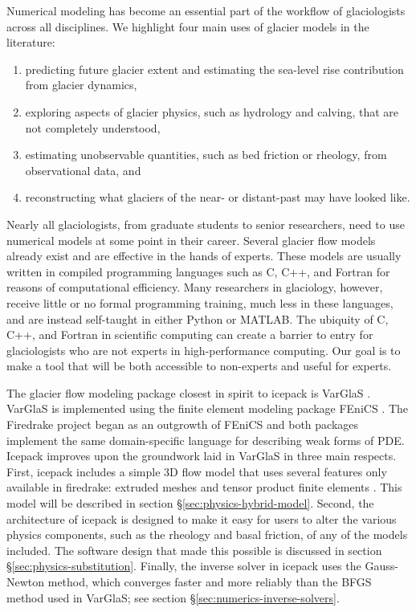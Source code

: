 \documentclass{article}
\theoremstyle{definition}
\theoremstyle{plain}
\begin{document}
Numerical modeling has become an essential part of the workflow of glaciologists across all disciplines.
We highlight four main uses of glacier models in the literature:
\begin{enumerate}
    \item predicting future glacier extent and estimating the sea-level rise contribution from glacier dynamics,
    \item exploring aspects of glacier physics, such as hydrology and calving, that are not completely understood,
    \item estimating unobservable quantities, such as bed friction or rheology, from observational data, and
    \item reconstructing what glaciers of the near- or distant-past may have looked like.
\end{enumerate}
Nearly all glaciologists, from graduate students to senior researchers, need to use numerical models at some point in their career.
Several glacier flow models already exist and are effective in the hands of experts.
These models are usually written in compiled programming languages such as C, C++, and Fortran for reasons of computational efficiency.
Many researchers in glaciology, however, receive little or no formal programming training, much less in these languages, and are instead self-taught in either Python or MATLAB.
The ubiquity of C, C++, and Fortran in scientific computing can create a barrier to entry for glaciologists who are not experts in high-performance computing.
Our goal is to make a tool that will be both accessible to non-experts and useful for experts.

The glacier flow modeling package closest in spirit to icepack is VarGlaS \citep{brinkerhoff2013data}.
VarGlaS is implemented using the finite element modeling package FEniCS \citep{logg2012automated}.
The Firedrake project began as an outgrowth of FEniCS and both packages implement the same domain-specific language for describing weak forms of PDE.
Icepack improves upon the groundwork laid in VarGlaS in three main respects.
First, icepack includes a simple 3D flow model that uses several features only available in firedrake: extruded meshes and tensor product finite elements \citep{bercea2016structure, mcrae2016automated}.
This model will be described in section \S\ref{sec:physics-hybrid-model}.
Second, the architecture of icepack is designed to make it easy for users to alter the various physics components, such as the rheology and basal friction, of any of the models included.
The software design that made this possible is discussed in section \S\ref{sec:physics-substitution}.
Finally, the inverse solver in icepack uses the Gauss-Newton method, which converges faster and more reliably than the BFGS method used in VarGlaS; see section \S\ref{sec:numerics-inverse-solvers}.
\end{document}
